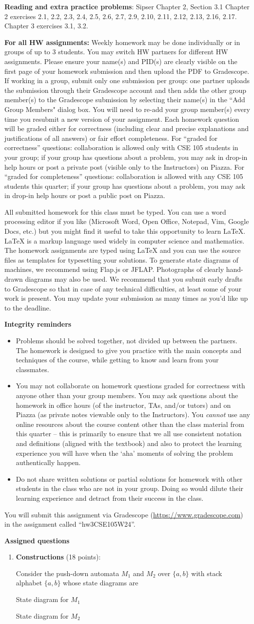 \documentclass[12pt, oneside]{article}
\newcommand{\instructions}{{\bf For all HW assignments:} Weekly homework 
may be done individually or in groups of up to 3 students. 
You may switch HW partners for different HW assignments. 
Please ensure your name(s) and PID(s) are clearly visible on the first page of your homework submission 
and then upload the PDF to Gradescope. If working in a group, submit only one submission per group: 
one partner uploads the submission through their Gradescope account and then adds the other group member(s) 
to the Gradescope submission by selecting their name(s) in the ``Add Group Members" dialog box. 
You will need to re-add your group member(s) every time you resubmit a new version of your assignment.
 Each homework question will be graded either for correctness (including clear and precise explanations and 
 justifications of all answers) or fair effort completeness. 
 For ``graded for correctness''
 questions: collaboration is allowed only with CSE 105 students in your group; 
 if your group has questions about a problem, you may ask in drop-in 
 help hours or post a private post (visible only to the Instructors) on Piazza.
 For ``graded for completeness''
 questions: collaboration is allowed with any CSE 105 students this quarter; 
 if your group has questions about a problem, you may ask in drop-in 
 help hours or post a public post on Piazza.

All submitted homework for this class must be typed. 
You can use a word processing editor if you like (Microsoft Word, Open Office, Notepad, Vim, Google Docs, etc.) 
but you might find it useful to take this opportunity to learn LaTeX. 
LaTeX is a markup language used widely in computer science and mathematics. 
The homework assignments are typed using LaTeX and you can use the source files 
as templates for typesetting your solutions.
To generate state diagrams of machines, we recommend using Flap.js
or JFLAP. Photographs of clearly hand-drawn diagrams may also be used. We recommend that you
submit early drafts to Gradescope so that in case of any technical difficulties, at least some of your
work is present. You may update your submission as many times as you'd like up to the deadline.


{\bf Integrity reminders}
\begin{itemize}
\item Problems should be solved together, not divided up between the partners. The homework is
designed to give you practice with the main concepts and techniques of the course, 
while getting to know and learn from your classmates.
\item You may not collaborate on homework questions graded for correctness with anyone other than your group members.
You may ask questions about the homework in office hours (of the instructor, TAs, and/or tutors) and 
on Piazza (as private notes viewable only to the Instructors).  
You \emph{cannot} use any online resources about the course content other than the class material 
from this quarter -- this is primarily to ensure that we all use consistent notation and
definitions (aligned with the textbook) and also to protect the learning experience you will have when
the `aha' moments of solving the problem authentically happen.
\item Do not share written solutions or partial solutions for homework with 
other students in the class who are not in your group. Doing so would dilute their learning 
experience and detract from their success in the class.
\end{itemize}

}
\begin{document}
{\bf Reading and extra practice problems}:  
Sipser Chapter 2, Section 3.1
Chapter 2 exercises 2.1, 2.2, 2.3, 2.4, 2.5, 2.6, 2.7, 2.9, 2.10, 2.11, 2.12, 2.13, 2.16, 2.17.
Chapter 3 exercises 3.1, 3.2. 

\instructions

You will submit this assignment via Gradescope
(\href{https://www.gradescope.com}{https://www.gradescope.com}) 
in the assignment called ``hw3CSE105W24''.

{\bf Assigned questions}
\begin{enumerate}[wide, labelwidth=!, labelindent=0pt]
\item \textbf{Constructions} (18 points):


Consider the push-down automata $M_1$ and $M_2$ over $\{a,b\}$ with stack alphabet $\{a, b\}$ whose state diagrams are

\begin{center}
\begin{multicols}{2}
    State diagram for $M_1$


    \columnbreak 

    State diagram for $M_2$

\end{multicols}
\end{center}
\end{enumerate}
\end{document}
